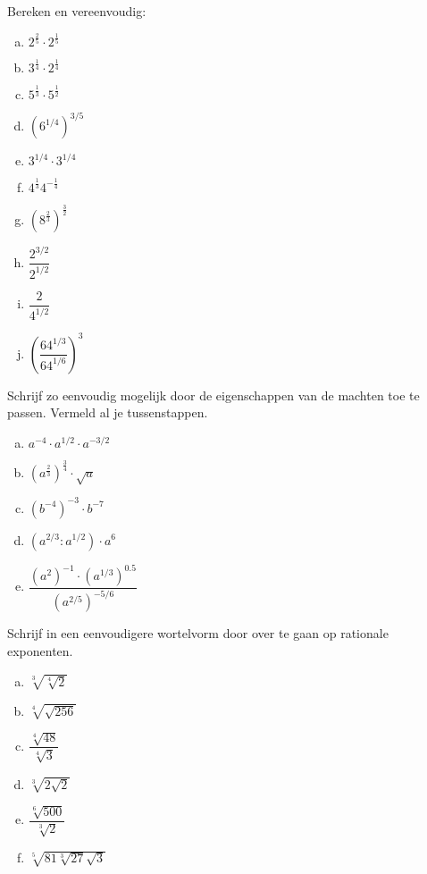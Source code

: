 \documentclass[12pt,twoside]{article}
\begin{document}
\begin{oefening}
Bereken en vereenvoudig:
\begin{multicols}{3}
\begin{enumerate}[(a)]
  \itemsep.5em
  \item $2^\frac{2}{5}\cdot2^\frac{1}{5}$
  \item $3^\frac{1}{4}\cdot 2^\frac{1}{4}$
  \item $5^\frac{1}{3}\cdot 5^\frac{1}{2}$
  \item $\left(6^{1/4}\right)^{3/5}$
  \item $3^{1/4}\cdot 3^{1/4}$
  \item $4^\frac{1}{3}4^{-\frac{1}{4}}$
  \item $\left(8^\frac{2}{3}\right)^\frac{3}{2}$
  \item $\dfrac{2^{3/2}}{2^{1/2}}$
  \item $\dfrac{2}{4^{1/2}}$
  \item $\left(\dfrac{64^{1/3}}{64^{1/6}}\right)^3$
\end{enumerate}
\end{multicols}
\end{oefening}

\begin{oefening}
Schrijf zo eenvoudig mogelijk door de eigenschappen van de machten toe te passen. Vermeld al je tussenstappen.
\begin{multicols}{2}
\begin{enumerate}[(a)]
  \itemsep.5em
  \item $a^{-4}\cdot a^{1/2}\cdot a^{-3/2}$
  \item $\left(a^{\frac{2}{3}}\right)^{\frac{3}{4}}\cdot \sqrt{a}$
  \item $\left(b^{-4}\right)^{-3}\cdot b^{-7}$
  \item $\left(a^{2/3}:a^{1/2}\right)\cdot a^6$
  \item $\dfrac{\left(a^2\right)^{-1}\cdot\left(a^{1/3}\right)^{0.5}}{\left(a^{2/5}\right)^{-5/6}}$
\end{enumerate}
\end{multicols}
\end{oefening}

\begin{oefening}
Schrijf in een eenvoudigere wortelvorm door over te gaan op rationale exponenten.
\begin{multicols}{3}
\begin{enumerate}[(a)]
  \itemsep1em
  \item $\sqrt[3]{\sqrt[4]{2}}$
  \item $\sqrt[4]{\sqrt{256}}$
  \item $\dfrac{\sqrt[4]{48}}{\sqrt[4]{3}}$
  \item $\sqrt[3]{2\sqrt{2}}$
  \item $\dfrac{\sqrt[6]{500}}{\sqrt[3]{2}}$
  \item $\sqrt[5]{81\sqrt[3]{27}\sqrt{3}}$
\end{enumerate}
\end{multicols}
\end{oefening}
\end{document}
